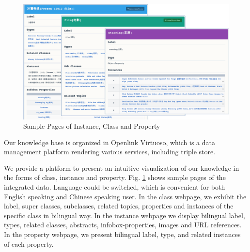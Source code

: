 \documentclass[runningheads,a4paper]{llncs}
\begin{document}
\begin{figure}[ht]
    \centerline{\includegraphics[width=1\columnwidth]{fig/xlore}}
    \caption{Sample Pages of Instance, Class and Property}
    \label{fig:xlore}
\end{figure}

Our knowledge base is organized in Openlink Virtuoso, which is a data management platform rendering various services, including triple store.

We provide a platform to present an intuitive visualization of our knowledge in the forms of class, instance and property. Fig. \ref{fig:xlore} shows sample pages of the integrated data. Language could be switched, which is convenient for both English speaking and Chinese speaking user. In the class webpage, we exhibit the label, super classes, subclasses, related topics, properties and instances of the specific class in bilingual way. In the instance webpage we display bilingual label, types, related classes, abstracts, infobox-properties, images and URL references. In the property webpage, we present bilingual label, type, and related instances of each property.
\end{document}
